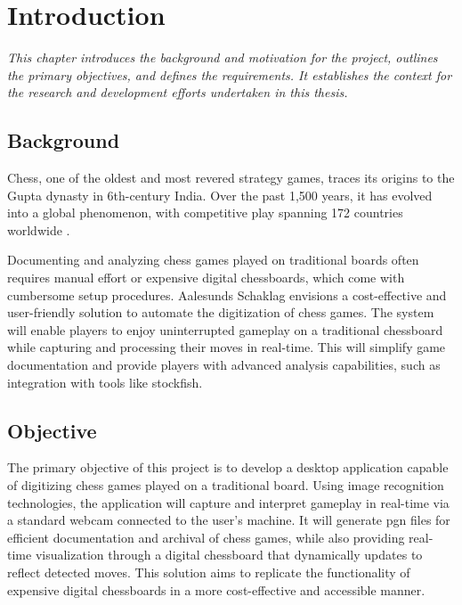 \chapter{Introduction}

\begin{center} \textit{This chapter introduces the background and motivation for the project, outlines the primary objectives, and defines the requirements. It establishes the context for the research and development efforts undertaken in this thesis.}
\end{center}

\section{Background}

Chess, one of the oldest and most revered strategy games, traces its origins to the Gupta dynasty in 6th-century India. Over the past 1,500 years, it has evolved into a global phenomenon, with competitive play spanning 172 countries worldwide \cite{artsnculture}. \

Documenting and analyzing chess games played on traditional boards often requires manual effort or expensive digital chessboards, which come with cumbersome setup procedures. Aalesunds Schaklag envisions a cost-effective and user-friendly solution to automate the digitization of chess games.  The system will enable players to enjoy uninterrupted gameplay on a traditional chessboard while capturing and processing their moves in real-time. This will simplify game documentation and provide players with advanced analysis capabilities, such as integration with tools like \gls{stockfish}.

\section{Objective}

The primary objective of this project is to develop a desktop application capable of digitizing chess games played on a traditional board. Using image recognition technologies, the application will capture and interpret gameplay in real-time via a standard webcam connected to the user's machine. It will generate \gls{pgn} files for efficient documentation and archival of chess games, while also providing real-time visualization through a digital chessboard that dynamically updates to reflect detected moves. This solution aims to replicate the functionality of expensive digital chessboards in a more cost-effective and accessible manner.

